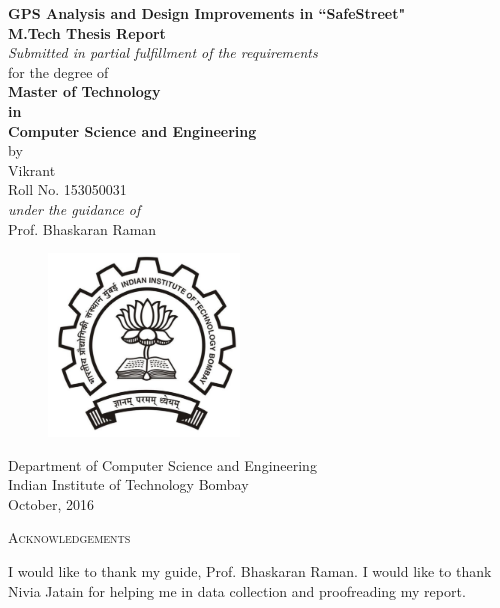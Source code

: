 \documentclass[12pt]{report}
\begin{document}
\begin{center}
  {\LARGE \textbf{GPS Analysis and Design Improvements in ``SafeStreet" }}\\[0.3in]
  {\large \textbf{M.Tech Thesis Report}}\\[0.1in]
  {\large \textit{Submitted in partial fulfillment of the requirements}\\
    for the degree of}\\[0.1in]
  {\large \textbf{Master of Technology\\
      in\\
      Computer Science and Engineering}}\\[0.2in]
  \large by\\[0.1in]
  {\Large Vikrant\\Roll No. 153050031}\\[0.1in]

  \Large \textit{under the guidance of}\\[0.1in]
  {\Large Prof. Bhaskaran Raman}\\[0.08in]
  \begin{figure}[h]
    \centering
    \includegraphics[width=2in]{iitb-black}
  \end{figure}

  {\Large Department of Computer Science and Engineering\\[0.08in]
    Indian Institute of Technology Bombay\\[0.08in]
    October, 2016 }
\end{center}
\pagebreak

\thispagestyle{plain}
\begin{center}{\huge{\textsc{Acknowledgements}} \par}\end{center}
\vspace*{15px}
\noindent

I would like to thank my guide, Prof. Bhaskaran Raman. I would like to thank
Nivia Jatain for helping me in data collection and proofreading my report.
\end{document}
